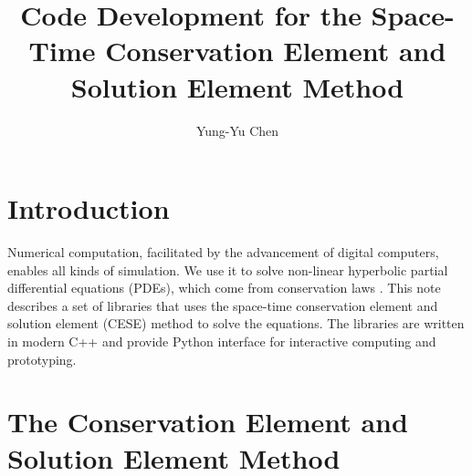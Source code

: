 \documentclass{turgon}
\title{
%
Code Development for the Space-Time Conservation Element and Solution Element
Method
%
}
\author{
%
Yung-Yu Chen
%
}
\begin{document}
\maketitle

\tableofcontents

\chapter*{Introduction}

Numerical computation, facilitated by the advancement of digital computers,
enables all kinds of simulation.  We use it to solve non-linear hyperbolic
partial differential equations (PDEs), which come from conservation laws
\citep{lax_hyperbolic_1973}.  This note describes a set of libraries that uses
the space-time conservation element and solution element (CESE) method to solve
the equations.  The libraries are written in modern C++ and provide Python
interface for interactive computing and prototyping.


\chapter{The Conservation Element and Solution Element Method}
\label{c:cese}
\end{document}
